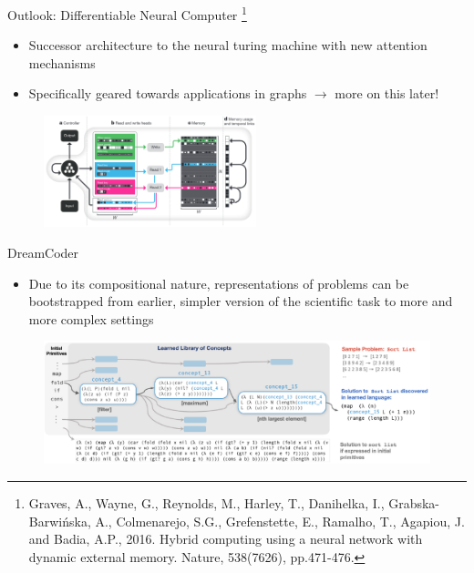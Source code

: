 \documentclass[AERbeamer%
              ,optEnglish%
              ,optBiber%
              ,optBibstyleAlphabetic%
              ,optBeamerClassicFormat%
              ]{AERlatex}%
\begin{document}
\begin{frame}[c]{Outlook: Differentiable Neural Computer \footnote{Graves, A., Wayne, G., Reynolds, M., Harley, T., Danihelka, I., Grabska-Barwińska, A., Colmenarejo,
                                                                   S.G., Grefenstette, E., Ramalho, T., Agapiou, J. and Badia, A.P., 2016. Hybrid computing using a
                                                                   neural network with dynamic external memory. Nature, 538(7626), pp.471-476.}}
    \centering
    \begin{itemize}
        \item Successor architecture to the neural turing machine with new attention mechanisms
        \item Specifically geared towards applications in graphs $\longrightarrow$  more on this later!
    \end{itemize}
    \begin{figure}
        \centering
        \includegraphics[width=0.55\textwidth]{DifferentiableNeuralComputerArchitecture.png}
    \end{figure}
\end{frame}


\begin{frame}[c]{DreamCoder}
    \centering
    \begin{itemize}
        \item Due to its compositional nature, representations of problems can be bootstrapped from earlier, simpler version of
              the scientific task to more and more complex settings
    \end{itemize}
    \vspace{1cm}
    \begin{figure}
        \centering
        \includegraphics[width=\textwidth]{DreamCoderCompositionality.png}
    \end{figure}
\end{frame} 
\end{document}
